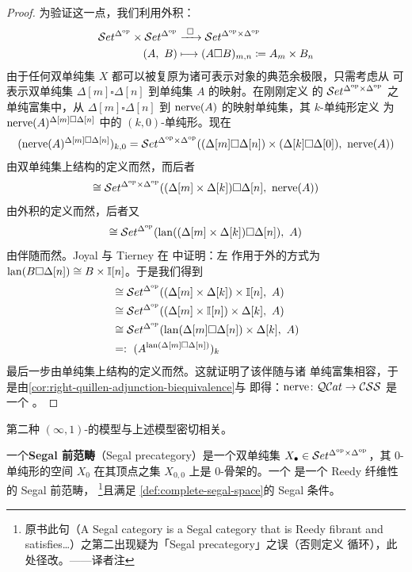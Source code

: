 \begin{proof}
为验证这一点，我们利用外积\trBifunctor：
\[
\begin{aligned}
\Set^{\Delta^{\mathrm{op}}}\times\Set^{\Delta^{\mathrm{op}}}
&\xrightarrow{\ \square\ }\Set^{\Delta^{\mathrm{op}}\times\Delta^{\mathrm{op}}}\\
(A,\ B) &\longmapsto (A\square B)_{m,n}\coloneqq A_{m}\times B_{n}
\end{aligned}
\]
由于任何双单纯集 $X$ 都可以被复原为诸可表示对象的典范余极限，只需考虑从
可表示双单纯集 $\Delta[m]\square\Delta[n]$ 到单纯集 $A$ 的映射。在刚刚定义
的 $\mathcal{S}et^{\Delta^{\mathrm{op}}\times\Delta^{\mathrm{op}}}$ 之单纯富集中，从
$\Delta[m]\square\Delta[n]$ 到 $\mathrm{nerve}(A)$ 的映射单纯集，其 $k$-单纯形定义
为 $\mathrm{nerve}(A)^{\Delta[m]\square\Delta[n]}$ 中的 $(k,0)$-单纯形。现在
\[
(\mathrm{nerve}(A)^{\Delta[m]\square\Delta[n]})_{k,0}
=\mathcal{S}et^{\Delta^{\mathrm{op}}\times\Delta^{\mathrm{op}}}((\Delta[m]\square\Delta[n])
\times(\Delta[k]\square\Delta[0]),\ \mathrm{nerve}(A))
\]
由双单纯集上\trCartesianClosed{}结构的定义而然，而后者
\[
\cong\mathcal{S}et^{\Delta^{\mathrm{op}}\times\Delta^{\mathrm{op}}}((\Delta[m]\times\Delta[k])
\square\Delta[n],\ \mathrm{nerve}(A))
\]
由外积的定义而然，后者又
\[
\cong\Set^{\Delta^{\mathrm{op}}}(\rvLan((\Delta[m]\times\Delta[k])\square\Delta[n]),\ A)
\]
由伴随而然。Joyal 与 Tierney 在 \cite[2.11]{bib64} 中证明：左\trKanExtension{}%
作用于外\trTensorProduct{}的方式为 $\mathrm{lan}(B\square\Delta[n])\cong B\times\mathbb{I}[n]$。于是我们得到
\[
\begin{aligned}
&\cong\Set^{\Delta^{\mathrm{op}}}((\Delta[m]\times\Delta[k])\times\qcInt[n],\ A)\\
&\cong\Set^{\Delta^{\mathrm{op}}}((\Delta[m]\times\qcInt[n])\times\Delta[k],\ A)\\
&\cong\Set^{\Delta^{\mathrm{op}}}(\rvLan(\Delta[m]\square\Delta[n])\times\Delta[k],\ A)\\
&=:\ (A^{\rvLan(\Delta[m]\square\Delta[n])})_{k}
\end{aligned}
\]
最后一步由单纯集上\trCartesianClosed{}结构的定义而然。这就证明了该伴随与诸
单纯富集相容，于是由\cref{cor:right-quillen-adjunction-biequivalence}与
\cite[4.12]{bib64} 即得：$\mathrm{nerve}\colon\mathcal{Q}\mathcal{C}at\to\mathcal{C}\mathcal{S}\mathcal{S}$ 是一个%
\trCosmologicalBiequivalence。
\end{proof}

第二种 $(\infty,1)$-\trCategory{}的模型与上述模型密切相关。

\begin{definition}[Segal 范畴]\label{def:segal-categories}
一个\textbf{Segal 前范畴}（Segal precategory）是一个双单纯集
$X_{\bullet}\in\mathcal{S}et^{\Delta^{\mathrm{op}}\times\Delta^{\mathrm{op}}}$，其
$0$-单纯形的空间 $X_{0}$ 在其顶点之集 $X_{0,0}$ 上是 $0$-骨架的。一个%
\textbf{\trSegalCategories{}}是一个 Reedy 纤维性的 Segal 前范畴，%
\footnote{原书此句（A Segal category is a Segal category that is Reedy fibrant and satisfies…）之第二出现疑为「Segal precategory」之误（否则定义
循环），此处径改。——译者注}且满足
\cref{def:complete-segal-space}的 Segal 条件。
\end{definition}

